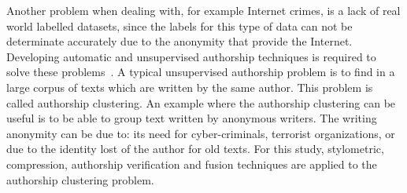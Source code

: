 Another problem when dealing with, for example Internet crimes, is a lack of real world labelled datasets, since the labels for this type of data can not be determinate accurately due to the anonymity that provide the Internet.
Developing automatic and unsupervised authorship techniques is required to solve these problems~\cite{automated_unsupervised}.
A typical unsupervised authorship problem is to find in a large corpus of texts which are written by the same author.
This problem is called authorship clustering.
An example where the authorship clustering can be useful is to be able to group text written by anonymous writers.
The writing anonymity can be due to: its need for cyber-criminals, terrorist organizations, or due to the identity lost of the author for old texts.
For this study, stylometric, compression, authorship verification and fusion techniques are applied to the authorship clustering problem.





